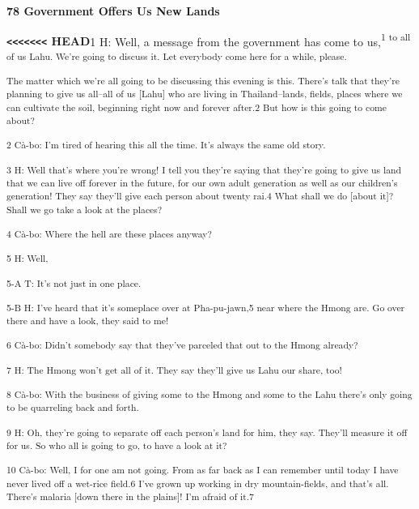 
{\textbf{78 Government Offers Us New Lands}}

{\textbf{\texttt{<}\texttt{<}\texttt{<}\texttt{<}\texttt{<}\texttt{<}\texttt{<}
HEAD}}{1 H: Well, a message from the government has come to us,}{\textsuperscript{1
to all of us Lahu. We're going to discuss it. Let everybody come here for a while,
please.}}

{\textsuperscript{The matter which we're all going to be discussing this
evening is this. There's talk that they're planning to give us all--all of us [Lahu]
who are living in Thailand--lands, fields, places where we can cultivate the soil,
beginning right now and forever after.2 But how is this going to come about?}}

{\textsuperscript{2 Cà-bo: I'm tired of hearing this all the time. It's
always the same old story. }}

{\textsuperscript{3 H: Well that's where you're wrong! I tell you they're
saying that they're going to give us land that we can live off forever in the future,
for our own adult generation as well as our children's generation! They say they'll
give each person about twenty rai.4 What shall we do [about it]? Shall we go take
a look at the places? }}

{\textsuperscript{4 Cà-bo: Where the hell are these places anyway?}}

{\textsuperscript{5 H: Well, }}

{\textsuperscript{5-A T: It's not just in one place.}}

{\textsuperscript{5-B H: I've heard that it's someplace over at Pha-pu-jawn,5
near where the Hmong are. Go over there and have a look, they said to me!}}

{\textsuperscript{6 Cà-bo: Didn't somebody say that they've parceled that
out to the Hmong already?}}

{\textsuperscript{7 H: The Hmong won't get all of it. They say they'll give
us Lahu our share, too! }}

{\textsuperscript{8 Cà-bo: With the business of giving some to the Hmong
and some to the Lahu there's only going to be quarreling back and forth.}}

{\textsuperscript{9 H: Oh, they're going to separate off each person's land
for him, they say. They'll measure it off for us. So who all is going to go, to
have a look at it?}}

{\textsuperscript{10 Cà-bo: Well, I for one am not going. From as far back
as I can remember until today I have never lived off a wet-rice field.6 I've grown
up working in dry mountain-fields, and that's all. There's malaria [down there
in the plains]! I'm afraid of it.7}}

